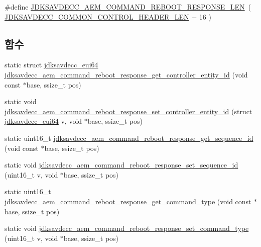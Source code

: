 \begin{DoxyCompactItemize}
\item 
\#define \hyperlink{group__command__reboot__response_ga4ddd352a3b1c5e5bb6db634872ab08e8}{J\+D\+K\+S\+A\+V\+D\+E\+C\+C\+\_\+\+A\+E\+M\+\_\+\+C\+O\+M\+M\+A\+N\+D\+\_\+\+R\+E\+B\+O\+O\+T\+\_\+\+R\+E\+S\+P\+O\+N\+S\+E\+\_\+\+L\+EN}~( \hyperlink{group__jdksavdecc__avtp__common__control__header_gaae84052886fb1bb42f3bc5f85b741dff}{J\+D\+K\+S\+A\+V\+D\+E\+C\+C\+\_\+\+C\+O\+M\+M\+O\+N\+\_\+\+C\+O\+N\+T\+R\+O\+L\+\_\+\+H\+E\+A\+D\+E\+R\+\_\+\+L\+EN} + 16 )
\end{DoxyCompactItemize}
\subsection*{함수}
\begin{DoxyCompactItemize}
\item 
static struct \hyperlink{structjdksavdecc__eui64}{jdksavdecc\+\_\+eui64} \hyperlink{group__command__reboot__response_gaa26cd76677d4919421c25666eefb5e18}{jdksavdecc\+\_\+aem\+\_\+command\+\_\+reboot\+\_\+response\+\_\+get\+\_\+controller\+\_\+entity\+\_\+id} (void const $\ast$base, ssize\+\_\+t pos)
\item 
static void \hyperlink{group__command__reboot__response_ga88b9be6b8d469f52900a719327efca93}{jdksavdecc\+\_\+aem\+\_\+command\+\_\+reboot\+\_\+response\+\_\+set\+\_\+controller\+\_\+entity\+\_\+id} (struct \hyperlink{structjdksavdecc__eui64}{jdksavdecc\+\_\+eui64} v, void $\ast$base, ssize\+\_\+t pos)
\item 
static uint16\+\_\+t \hyperlink{group__command__reboot__response_ga34e1024f31e3c8879e7177d06709b0c2}{jdksavdecc\+\_\+aem\+\_\+command\+\_\+reboot\+\_\+response\+\_\+get\+\_\+sequence\+\_\+id} (void const $\ast$base, ssize\+\_\+t pos)
\item 
static void \hyperlink{group__command__reboot__response_ga2798edfb2c8d22c46fccbfec2f43b542}{jdksavdecc\+\_\+aem\+\_\+command\+\_\+reboot\+\_\+response\+\_\+set\+\_\+sequence\+\_\+id} (uint16\+\_\+t v, void $\ast$base, ssize\+\_\+t pos)
\item 
static uint16\+\_\+t \hyperlink{group__command__reboot__response_ga1a73fedd971ee1c6acadc2a697447352}{jdksavdecc\+\_\+aem\+\_\+command\+\_\+reboot\+\_\+response\+\_\+get\+\_\+command\+\_\+type} (void const $\ast$base, ssize\+\_\+t pos)
\item 
static void \hyperlink{group__command__reboot__response_ga80aff91643ca93907a4335919ae07f20}{jdksavdecc\+\_\+aem\+\_\+command\+\_\+reboot\+\_\+response\+\_\+set\+\_\+command\+\_\+type} (uint16\+\_\+t v, void $\ast$base, ssize\+\_\+t pos)

\end{DoxyCompactItemize}
